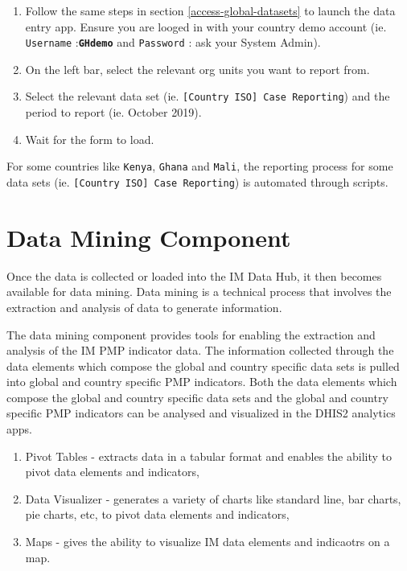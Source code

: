 \documentclass[]{book}
\providecommand{\tightlist}{%
  \setlength{\itemsep}{0pt}\setlength{\parskip}{0pt}}
\begin{document}
\begin{enumerate}
\def\labelenumi{\arabic{enumi}.}
\item
  Follow the same steps in section \ref{access-global-datasets} to launch the data entry app. Ensure you are looged in with your country demo account (ie. \texttt{Username} :\textbf{\texttt{GHdemo}} and \texttt{Password} : ask your System Admin).
\item
  On the left bar, select the relevant org units you want to report from.
\item
  Select the relevant data set (ie. \texttt{{[}Country\ ISO{]}\ Case\ Reporting}) and the period to report (ie. October 2019).
\item
  Wait for the form to load.
\end{enumerate}

For some countries like \texttt{Kenya}, \texttt{Ghana} and \texttt{Mali}, the reporting process for some data sets (ie. \texttt{{[}Country\ ISO{]}\ Case\ Reporting}) is automated through scripts.

\hypertarget{data-mining-component}{%
\section{Data Mining Component}\label{data-mining-component}}

Once the data is collected or loaded into the IM Data Hub, it then becomes available for data mining. Data mining is a technical process that involves the extraction and analysis of data to generate information.

The data mining component provides tools for enabling the extraction and analysis of the IM PMP indicator data. The information collected through the data elements which compose the global and country specific data sets is pulled into global and country specific PMP indicators. Both the data elements which compose the global and country specific data sets and the global and country specific PMP indicators can be analysed and visualized in the DHIS2 analytics apps.

\begin{enumerate}
\def\labelenumi{\arabic{enumi}.}
\tightlist
\item
  Pivot Tables - extracts data in a tabular format and enables the ability to pivot data elements and indicators,
\item
  Data Visualizer - generates a variety of charts like standard line, bar charts, pie charts, etc, to pivot data elements and indicators,
\item
  Maps - gives the ability to visualize IM data elements and indicaotrs on a map.
\end{enumerate}
\end{document}
